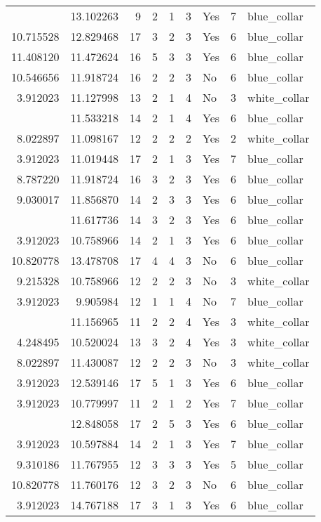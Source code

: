 \documentclass[
]{article}
\begin{document}
\begin{longtable}[t]{rrrrrllrl}
\addlinespace
3.912023 & 13.102263 & 9 & 2 & 1 & 3 & Yes & 7 & blue\_collar\\
10.715528 & 12.829468 & 17 & 3 & 2 & 3 & Yes & 6 & blue\_collar\\
11.408120 & 11.472624 & 16 & 5 & 3 & 3 & Yes & 6 & blue\_collar\\
10.546656 & 11.918724 & 16 & 2 & 2 & 3 & No & 6 & blue\_collar\\
3.912023 & 11.127998 & 13 & 2 & 1 & 4 & No & 3 & white\_collar\\
\addlinespace
3.912023 & 11.533218 & 14 & 2 & 1 & 4 & Yes & 6 & blue\_collar\\
8.022897 & 11.098167 & 12 & 2 & 2 & 2 & Yes & 2 & white\_collar\\
3.912023 & 11.019448 & 17 & 2 & 1 & 3 & Yes & 7 & blue\_collar\\
8.787220 & 11.918724 & 16 & 3 & 2 & 3 & Yes & 6 & blue\_collar\\
9.030017 & 11.856870 & 14 & 2 & 3 & 3 & Yes & 6 & blue\_collar\\
\addlinespace
7.346010 & 11.617736 & 14 & 3 & 2 & 3 & Yes & 6 & blue\_collar\\
3.912023 & 10.758966 & 14 & 2 & 1 & 3 & Yes & 6 & blue\_collar\\
10.820778 & 13.478708 & 17 & 4 & 4 & 3 & No & 6 & blue\_collar\\
9.215328 & 10.758966 & 12 & 2 & 2 & 3 & No & 3 & white\_collar\\
3.912023 & 9.905984 & 12 & 1 & 1 & 4 & No & 7 & blue\_collar\\
\addlinespace
7.346010 & 11.156965 & 11 & 2 & 2 & 4 & Yes & 3 & white\_collar\\
4.248495 & 10.520024 & 13 & 3 & 2 & 4 & Yes & 3 & white\_collar\\
8.022897 & 11.430087 & 12 & 2 & 2 & 3 & No & 3 & white\_collar\\
3.912023 & 12.539146 & 17 & 5 & 1 & 3 & Yes & 6 & blue\_collar\\
3.912023 & 10.779997 & 11 & 2 & 1 & 2 & Yes & 7 & blue\_collar\\
\addlinespace
9.905984 & 12.848058 & 17 & 2 & 5 & 3 & Yes & 6 & blue\_collar\\
3.912023 & 10.597884 & 14 & 2 & 1 & 3 & Yes & 7 & blue\_collar\\
9.310186 & 11.767955 & 12 & 3 & 3 & 3 & Yes & 5 & blue\_collar\\
10.820778 & 11.760176 & 12 & 3 & 2 & 3 & No & 6 & blue\_collar\\
3.912023 & 14.767188 & 17 & 3 & 1 & 3 & Yes & 6 & blue\_collar\\

\end{longtable}
\end{document}

